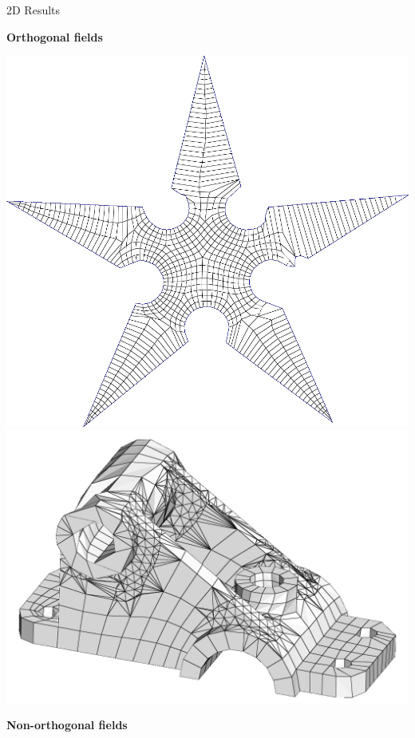 \documentclass{beamer}
\begin{document}
\begin{frame}{2D Results}
    \centering
    
    \begin{minipage}[c]{0.45\textwidth}
    \centering 
    \textbf{Orthogonal fields}
    \vspace*{1\baselineskip}
    
     \includegraphics[width=0.7\linewidth]{img_spm_ff/quads_ortho_shurik0.PNG}
    \includegraphics[width=0.8\linewidth]{img_spm_ff/q_2_ortho_fail.PNG}
    \end{minipage}%
    \hfill\vline\hfill
    \begin{minipage}[c]{0.45\textwidth}
    \centering 
    \textbf{Non-orthogonal fields}
    \vspace*{1\baselineskip}
    

\end{minipage}
\end{frame}
\end{document}
